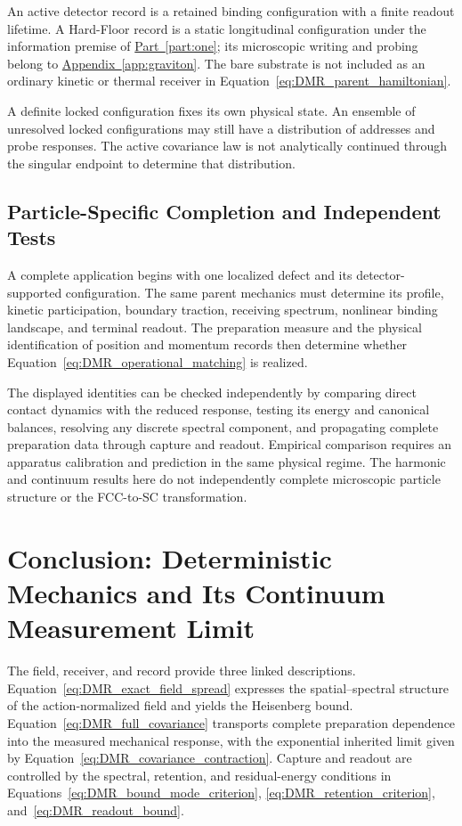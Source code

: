 An active detector record is a retained binding configuration with a finite readout lifetime. A Hard-Floor record is a static longitudinal configuration under the information premise of \hyperref[part:one]{Part~\ref*{part:one}}; its microscopic writing and probing belong to \hyperref[app:graviton]{Appendix~\ref*{app:graviton}}. The bare substrate is not included as an ordinary kinetic or thermal receiver in Equation~\eqref{eq:DMR_parent_hamiltonian}.

A definite locked configuration fixes its own physical state. An ensemble of unresolved locked configurations may still have a distribution of addresses and probe responses. The active covariance law is not analytically continued through the singular endpoint to determine that distribution.

\subsection{Particle-Specific Completion and Independent Tests}

A complete application begins with one localized defect and its detector-supported configuration. The same parent mechanics must determine its profile, kinetic participation, boundary traction, receiving spectrum, nonlinear binding landscape, and terminal readout. The preparation measure and the physical identification of position and momentum records then determine whether Equation~\eqref{eq:DMR_operational_matching} is realized.

The displayed identities can be checked independently by comparing direct contact dynamics with the reduced response, testing its energy and canonical balances, resolving any discrete spectral component, and propagating complete preparation data through capture and readout. Empirical comparison requires an apparatus calibration and prediction in the same physical regime. The harmonic and continuum results here do not independently complete microscopic particle structure or the FCC-to-SC transformation.

\section*{Conclusion: Deterministic Mechanics and Its Continuum Measurement Limit}

The field, receiver, and record provide three linked descriptions. Equation~\eqref{eq:DMR_exact_field_spread} expresses the spatial--spectral structure of the action-normalized field and yields the Heisenberg bound. Equation~\eqref{eq:DMR_full_covariance} transports complete preparation dependence into the measured mechanical response, with the exponential inherited limit given by Equation~\eqref{eq:DMR_covariance_contraction}. Capture and readout are controlled by the spectral, retention, and residual-energy conditions in Equations~\eqref{eq:DMR_bound_mode_criterion}, \eqref{eq:DMR_retention_criterion}, and~\eqref{eq:DMR_readout_bound}.

